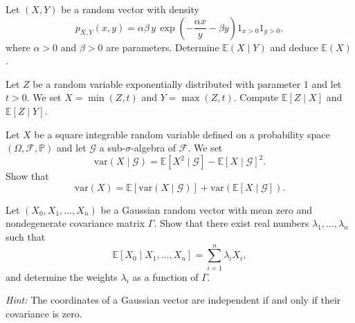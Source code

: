 \begin{exercise}
Let $(X,Y)$ be a random vector with density
\[
p_{X,Y}(x,y) = \alpha \beta \, y \, \exp\!\left(-\frac{\alpha x}{y} - \beta y\right) 1_{x>0} 1_{y>0},
\]
where $\alpha > 0$ and $\beta > 0$ are parameters. Determine $\mathbb{E}(X \mid Y)$ and deduce $\mathbb{E}(X)$.
\end{exercise}

\begin{exercise}
Let $Z$ be a random variable exponentially distributed with parameter $1$ and let $t > 0$. We set $X = \min(Z,t)$ and $Y = \max(Z,t)$. Compute $\mathbb{E}[Z \mid X]$ and $\mathbb{E}[Z \mid Y]$.
\end{exercise}

\begin{exercise}
Let $X$ be a square integrable random variable defined on a probability space $(\Omega,\mathcal{F},\mathbb{P})$ and let $\mathcal{G}$ a sub-$\sigma$-algebra of $\mathcal{F}$. We set
\[
\mathrm{var}(X \mid \mathcal{G}) = \mathbb{E}[X^2 \mid \mathcal{G}] - \mathbb{E}[X \mid \mathcal{G}]^2.
\]
Show that
\[
\mathrm{var}(X) = \mathbb{E}[\mathrm{var}(X \mid \mathcal{G})] + \mathrm{var}(\mathbb{E}[X \mid \mathcal{G}]).
\]
\end{exercise}

\begin{exercise}
Let $(X_0, X_1, \ldots, X_n)$ be a Gaussian random vector with mean zero and nondegenerate covariance matrix $\Gamma$. Show that there exist real numbers $\lambda_1, \ldots, \lambda_n$ such that
\[
\mathbb{E}[X_0 \mid X_1, \ldots, X_n] = \sum_{i=1}^n \lambda_i X_i,
\]
and determine the weights $\lambda_i$ as a function of $\Gamma$.  

\textit{Hint:} The coordinates of a Gaussian vector are independent if and only if their covariance is zero.
\end{exercise}
